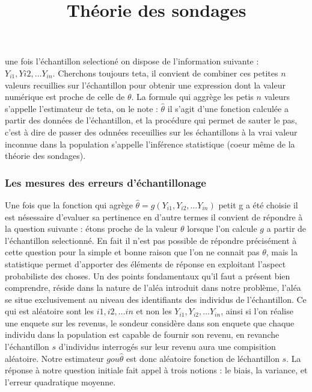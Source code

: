 \documentclass[a4paper]{article}
\title{Théorie des sondages}
\begin{document}
\maketitle
\tableofcontents

\part{}

\section{}
une fois l'échantillon selectioné on dispose de l'information suivante : $Y_{i1}, Y{i2}, \ldots Y_{in}$. Cherchons toujours teta, il convient de 
combiner ces petites $n$ valeurs recuillies sur l'échantillon pour obtenir une expression dont la valeur numérique est proche de celle de $\theta$. La
formule qui aggrège les petis $n$ valeurs s'appelle l'estimateur de teta, on le note :  $\hat{\theta}$ il s'agit d'une fonction calculée a partir des
données de l'échantillon, et la procédure qui permet de sauter le pas, c'est à dire de passer des odnnées receuillies sur les échantillons à la vrai
valeur inconnue dans la population s'appelle l'inférence statistique (coeur même de la théorie des sondages).

\section{Les mesures des erreurs d'échantillonage}
Une fois que la fonction qui agrège $\hat{\theta} = g(Y_{i1}, Y_{i2}, \ldots Y_{in})$ petit g a été choisie il est nésessaire d'evaluer sa pertinence en
d'autre termes il convient de répondre à la question suivante : étons proche de la valeur $\theta$ lorsque l'on calcule $g$ a partir de
l'échantillon selectionné. En fait il n'est pas possible de répondre précisément à cette question pour la simple et bonne raison que l'on ne connait
pas $\theta$, mais la statistique permet d'apporter des éléments de réponse en exploitant l'aspect probabiliste des choses. Un des points fondamentaux
qu'il faut a présent bien comprendre, réside dans la nature de l'aléa introduit dans notre problème, l'aléa se situe exclusivement au niveau des
identifiants des individus de l'échantillon.
Ce qui est aléatoire sont les $i1, i2, \ldots in$ et non les $ Y_{i1}, Y_{i2}, \ldots Y_{in}$, ainsi si l'on réalise une enquete sur les revenus, le
sondeur considère dans son enquete que chaque individu dans la population est capable de fournir son revenu, en revanche l'échantillon $s$ d'individus
interrogés sur leur revenu aura une compisition aléatoire. Notre estimateur  $g ou \hat{\theta}$ est donc aléatoire fonction de léchantillon $s$. La
réponse à notre question initiale fait appel à trois notions : le biais, la variance, et l'erreur quadratique moyenne. 
\end{document}
